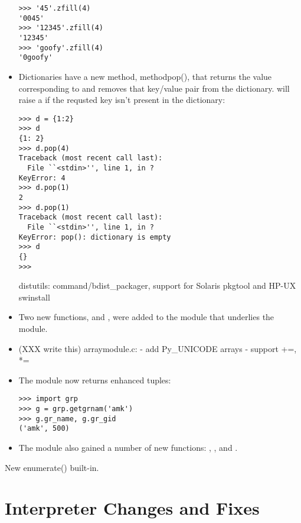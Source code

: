 \documentclass{howto}
\begin{document}
\begin{itemize}
\begin{verbatim}
>>> '45'.zfill(4)
'0045'
>>> '12345'.zfill(4)
'12345'
>>> 'goofy'.zfill(4)
'0goofy'
\end{verbatim}

\item Dictionaries have a new method, method{pop()}, that
returns the value corresponding to  and removes that
key/value pair from the dictionary.   will raise a
 if the requsted key isn't present in the
dictionary:

\begin{verbatim}
>>> d = {1:2}
>>> d
{1: 2}
>>> d.pop(4)
Traceback (most recent call last):
  File ``<stdin>'', line 1, in ?
KeyError: 4
>>> d.pop(1)
2
>>> d.pop(1)
Traceback (most recent call last):
  File ``<stdin>'', line 1, in ?
KeyError: pop(): dictionary is empty
>>> d
{}
>>>
\end{verbatim}

distutils: command/bdist_packager, support for Solaris pkgtool 
and HP-UX swinstall


\item Two new functions,  and ,
were added to the  module that underlies the 
module.

\item (XXX write this) arraymodule.c: - add Py_UNICODE arrays 
- support +=, *=

\item The  module now returns enhanced tuples:

\begin{verbatim}
>>> import grp
>>> g = grp.getgrnam('amk')
>>> g.gr_name, g.gr_gid
('amk', 500)
\end{verbatim}

\item The  module also gained a number of new
functions: ,
, and .

\end{itemize}


New enumerate() built-in.

\section{Interpreter Changes and Fixes}
\end{document}
